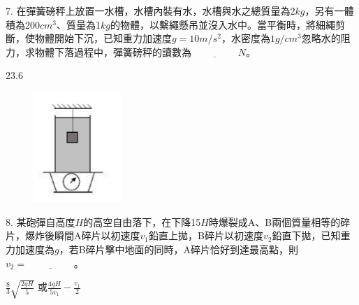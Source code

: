 \documentclass[cn,10pt,math=newtx,chinesefont=founder,device=ig]{elegantbook}
\begin{document}
\begin{example}
   7. 在彈簧磅秤上放置一水槽，水槽內裝有水，水槽與水之總質量為2$kg$，另有一體積為200$cm^3$、質量為1$kg$的物體，以繫繩懸吊並沒入水中。當平衡時，將細繩剪斷，使物體開始下沉，已知重力加速度$g=10m/s^2$，水密度為$1g/cm^3$忽略水的阻力，求物體下落過程中，彈簧磅秤的讀數為$\underline{\hspace{2cm}} N$。\\
    \rightline{[桃園高中教甄109]}
\end{example}
\begin{solution}
    $23.6$
\end{solution}
\begin{figure}[htbp]
    \flushright
    \includegraphics[width=0.3\textwidth]{image/109桃園7.png}
  \end{figure}
\newpage

\begin{example}
   8. 某砲彈自高度$H$的高空自由落下，在下降15$H$時爆裂成A、B兩個質量相等的碎片，爆炸後瞬間A碎片以初速度$v_1$鉛直上拋，B碎片以初速度$v_2$鉛直下拋，已知重力加速度為$g$，若B碎片擊中地面的同時，A碎片恰好到達最高點，則$v_2=\underline{\hspace{2cm}}$。\\
    \rightline{[桃園高中教甄109]}
\end{example}
\begin{solution}
    $\frac{8}{3} \sqrt{\frac{2gH}{5}}$ 或$\frac{4gH}{5v_1}-\frac{v_1}{2}$
\end{solution}

\newpage
\end{document}
